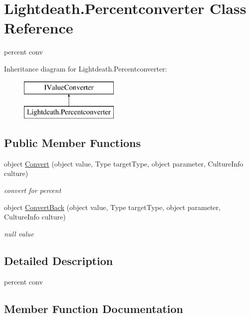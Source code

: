 \hypertarget{class_lightdeath_1_1_percentconverter}{}\section{Lightdeath.\+Percentconverter Class Reference}
\label{class_lightdeath_1_1_percentconverter}


percent conv  


Inheritance diagram for Lightdeath.\+Percentconverter\+:\begin{figure}[H]
\begin{center}
\leavevmode
\includegraphics[height=2.000000cm]{class_lightdeath_1_1_percentconverter}
\end{center}
\end{figure}
\subsection*{Public Member Functions}
\begin{DoxyCompactItemize}
\item 
object \hyperlink{class_lightdeath_1_1_percentconverter_a97fe65907e5ac713df28eee12241744e}{Convert} (object value, Type target\+Type, object parameter, Culture\+Info culture)
\begin{DoxyCompactList}\small\item\em convert for percent \end{DoxyCompactList}\item 
object \hyperlink{class_lightdeath_1_1_percentconverter_ad1c468f593f5cbb6d5b970c3402d37f6}{Convert\+Back} (object value, Type target\+Type, object parameter, Culture\+Info culture)
\begin{DoxyCompactList}\small\item\em null value \end{DoxyCompactList}\end{DoxyCompactItemize}


\subsection{Detailed Description}
percent conv 



\subsection{Member Function Documentation}
\hypertarget{class_lightdeath_1_1_percentconverter_a97fe65907e5ac713df28eee12241744e}{}\label{class_lightdeath_1_1_percentconverter_a97fe65907e5ac713df28eee12241744e} 
